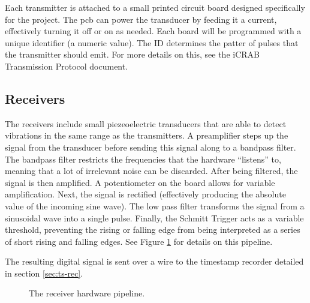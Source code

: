 \documentclass[12pt]{article}
\begin{document}
Each transmitter is attached to a small printed circuit board designed
specifically for the project.
The \gls{pcb} can power the transducer by feeding it a current, effectively
turning it off or on as needed.
Each board will be programmed with a unique identifier (a numeric value).
The ID determines the patter of pulses that the transmitter should emit.
For more details on this, see the iCRAB Transmission Protocol document.

\subsection{Receivers}

The receivers include small piezeoelectric transducers that are able to detect
vibrations in the same range as the transmitters.
A preamplifier steps up the signal from the transducer before sending this
signal along to a bandpass filter.
The bandpass filter restricts the frequencies that the hardware ``listens''
to, meaning that a lot of irrelevant noise can be discarded.
After being filtered, the signal is then amplified.
A potentiometer on the board allows for variable amplification.
Next, the signal is
rectified (effectively producing the absolute value of the incoming sine wave).
The low pass filter transforms the signal from a sinusoidal wave into a single
pulse.
Finally, the Schmitt Trigger acts as a variable threshold, preventing the
rising or falling edge from being interpreted as a series of short rising and
falling edges.
See Figure \ref{fig:rx-detail} for details on this pipeline.

The resulting digital signal is sent over a wire to the timestamp
recorder detailed in section \ref{sec:ts-rec}.

\begin{figure}[h]
\begin{center}
\end{center}
\caption{The receiver hardware pipeline.}
\label{fig:rx-detail}
\end{figure}
\end{document}
